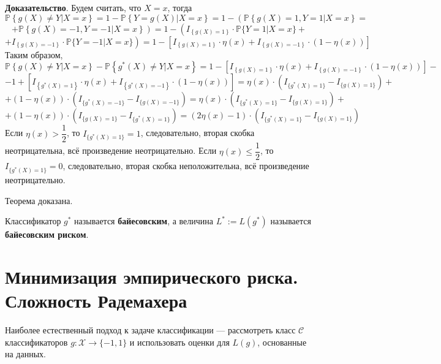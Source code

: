 \documentclass[12pt]{article}
\begin{document}
\textbf{Доказательство}. Будем считать, что $X=x$, тогда 
\begin{equation*}
	\mathbb{P}\left\{g(X)\ne Y|X=x\right\}=1-\mathbb{P}\left\{Y=g(X)|X=x\right\}=1-\left(\mathbb{P}\left\{g(X)=1, Y=1|X=x\right\}\right.=
\end{equation*}
\begin{equation*}
	\left.+\mathbb{P}\left\{g(X)=-1, Y=-1|X=x\right\}\right)=1-\left(I_{\left\{g(X)=1\right\}}\cdot\mathbb{P}\{Y=1|X=x\}\right.+
\end{equation*}
\begin{equation*}
	\left.+I_{\left\{g(X)=-1\right\}}\cdot\mathbb{P}\{Y=-1|X=x\}\right)=1-\left[I_{\left\{g(X)=1\right\}}\cdot\eta(x)+I_{\left\{g(X)=-1\right\}}\cdot(1-\eta(x))\right]
\end{equation*}
Таким образом,
\begin{equation*}
	\mathbb{P}\left\{g(X)\ne Y|X=x\right\}-\mathbb{P}\left\{g^*(X)\ne Y|X=x\right\}=1-\left[I_{\left\{g(X)=1\right\}}\cdot\eta(x)+I_{\left\{g(X)=-1\right\}}\cdot(1-\eta(x))\right]-
\end{equation*}
\begin{equation*}
	-1+\left[I_{\left\{g^*(X)=1\right\}}\cdot\eta(x)+I_{\left\{g^*(X)=-1\right\}}\cdot(1-\eta(x))\right]=\eta(x)\cdot(I_{\{g^*(X)=1\}}-I_{\{g(X)=1\}})+
\end{equation*}
\begin{equation*}
	+(1-\eta(x))\cdot\left(I_{\{g^*(X)=-1\}}-I_{\{g(X)=-1\}}\right)=\eta(x)\cdot(I_{\{g^*(X)=1\}}-I_{\{g(X)=1\}})+
\end{equation*}
\begin{equation*}
	+(1-\eta(x))\cdot(I_{\{g(X)=1\}}-I_{\{g^*(X)=1\}})=(2\eta(x)-1)\cdot(I_{\{g^*(X)=1\}}-I_{\{g(X)=1\}})
\end{equation*}
Если $\eta(x)>\dfrac{1}{2}$, то $I_{\{g^*(X)=1\}}=1$, следовательно, вторая скобка неотрицательна, всё произведение неотрицательно. Если $\eta(x)\leqslant\dfrac{1}{2}$, то $I_{\{g^*(X)=1\}}=0$, следовательно, вторая скобка неположительна, всё произведение неотрицательно.

Теорема доказана.

Классификатор $g^*$ называется \textbf{байесовским}, а величина $L^*:=L(g^*)$ называется \textbf{байесовским риском}.
\section{Минимизация эмпирического риска. Сложность Радемахера}
Наиболее естественный подход к задаче классификации --- рассмотреть класс $\mathcal{C}$ классификаторов $g:\mathcal{X}\to\{-1,1\}$ и использовать оценки для $L(g)$, основанные на данных.
\end{document}
